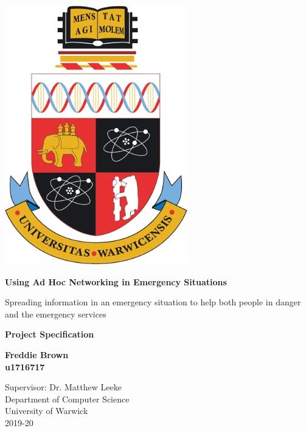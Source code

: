 \documentclass{report}
\begin{document}
\begin{titlepage}
    \begin{center}
        \vspace{1.0cm}
        \includegraphics[scale=0.5]{Warwick}
        \vspace*{1cm}
  
        \textbf{Using Ad Hoc Networking in Emergency Situations}
  
        \vspace{0.5cm}
        Spreading information in an emergency situation to help both people in danger and the emergency services
  
        \vspace{1.5cm}

        \textbf{Project Specification}
  
        \vspace{1.6cm}

        \textbf{Freddie Brown}\\
        \textbf{u1716717}


  
        \vspace{1.6cm}
        Supervisor: Dr. Matthew Leeke\\
        Department of Computer Science\\
        University of Warwick\\
        2019-20
  
    \end{center}
\end{titlepage}
\end{document}
